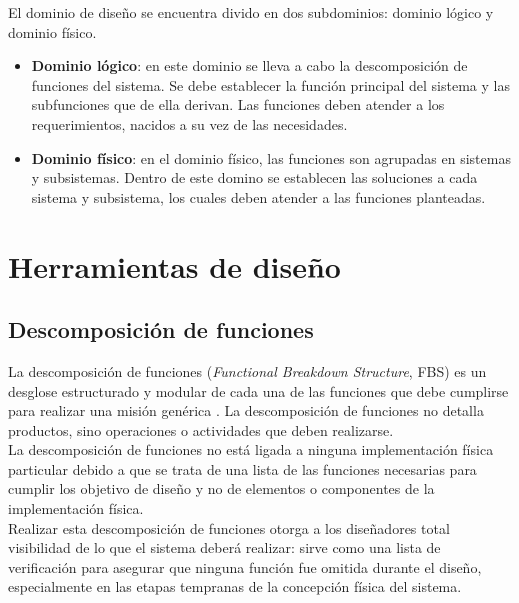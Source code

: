 \noindent El dominio de dise\~{n}o se encuentra divido en dos subdominios: dominio l\'ogico y dominio f\'isico.
\begin{itemize}
	\item \textbf{Dominio l\'ogico}: en este dominio se lleva a cabo la descomposici\'on de funciones del sistema. Se debe establecer la funci\'on principal del sistema y las subfunciones que de ella derivan. Las funciones deben atender a los requerimientos, nacidos a su vez de las necesidades. 
	\item \textbf{Dominio f\'isico}: en el dominio f\'isico, las funciones son agrupadas en sistemas y subsistemas. Dentro de este domino se establecen las soluciones a cada sistema y subsistema, los cuales deben atender a las funciones planteadas.
\end{itemize}

	\section{Herramientas de dise\~{n}o} \label{sec:tools}
		\subsection{Descomposici\'on de funciones} \label{subsec:fbs}
La descomposici\'on de funciones (\textit{Functional Breakdown Structure}, FBS) es un desglose estructurado y modular de cada una de las funciones que debe cumplirse para realizar una misi\'on gen\'erica \cite{fbsnasa_2009}. La descomposici\'on de funciones no detalla productos, sino operaciones o actividades que deben realizarse.\\

\noindent La descomposici\'on de funciones no est\'a ligada a ninguna implementaci\'on f\'isica particular debido a que se trata de una lista de las funciones necesarias para cumplir los objetivo de dise\~{n}o y no de elementos o componentes de la implementaci\'on f\'isica.\\

\noindent Realizar esta descomposici\'on de funciones otorga a los dise\~{n}adores total visibilidad de lo que el sistema deber\'a realizar: sirve como una lista de verificaci\'on para asegurar que ninguna funci\'on fue omitida durante el dise\~{n}o, especialmente en las etapas tempranas de la concepci\'on f\'isica del sistema.\\

